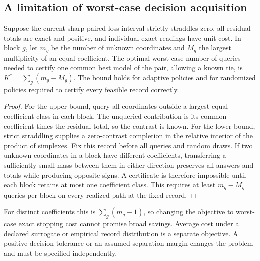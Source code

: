 \subsection{A limitation of worst-case decision acquisition}
\label{app:decision-worstcase}
\begin{proposition}
\label{prop:decision-worstcase}
Suppose the current sharp paired-loss interval strictly straddles zero,
all residual totals are exact and positive, and individual exact readings
have unit cost. In block $g$, let $m_g$ be the number of unknown coordinates
and $M_g$ the largest multiplicity of an equal coefficient.
The optimal worst-case number of queries needed to certify one common
best model of the pair, allowing a known tie, is
$K^*=\sum_g(m_g-M_g)$. The bound holds for adaptive policies and for
randomized policies required to certify every feasible record correctly.
\end{proposition}
\begin{proof}
For the upper bound, query all coordinates outside a largest
equal-coefficient class in each block. The unqueried contribution is
its common coefficient times the residual total, so the contrast is known.
For the lower bound, strict straddling supplies a zero-contrast completion
in the relative interior of the product of simplexes. Fix this record
before all queries and random draws. If two unknown coordinates in a
block have different coefficients, transferring a sufficiently small mass
between them in either direction preserves all answers and totals while
producing opposite signs. A certificate is therefore impossible until
each block retains at most one coefficient class. This requires at least
$m_g-M_g$ queries per block on every realized path at the fixed record.
\end{proof}
For distinct coefficients this is $\sum_g(m_g-1)$, so changing the
objective to worst-case exact stopping cost cannot promise broad savings.
Average cost under a declared surrogate or empirical record distribution
is a separate objective. A positive decision tolerance or an assumed
separation margin changes the problem and must be specified independently.

